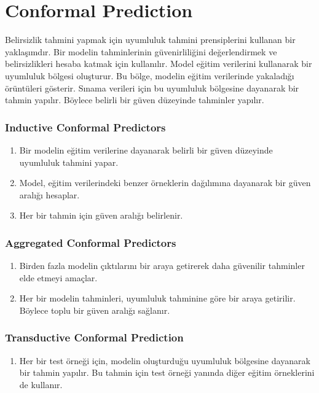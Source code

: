 \section{Conformal Prediction}
Belirsizlik tahmini yapmak için uyumluluk tahmini prensiplerini kullanan bir yaklaşımdır. Bir modelin tahminlerinin güvenirliliğini değerlendirmek ve belirsizlikleri hesaba katmak için kullanılır. Model eğitim verilerini kullanarak bir uyumluluk bölgesi oluşturur. Bu bölge, modelin eğitim verilerinde yakaladığı örüntüleri gösterir. Sınama verileri için bu uyumluluk bölgesine dayanarak bir tahmin yapılır. Böylece belirli bir güven düzeyinde tahminler yapılır.

\subsubsection{Inductive Conformal Predictors}
\begin{enumerate}
    \item Bir modelin eğitim verilerine dayanarak belirli bir güven düzeyinde uyumluluk tahmini yapar.
    \item Model, eğitim verilerindeki benzer örneklerin dağılımına dayanarak bir güven aralığı hesaplar.
    \item Her bir tahmin için güven aralığı belirlenir.
\end{enumerate}

\subsubsection{Aggregated Conformal Predictors}
\begin{enumerate}
    \item Birden fazla modelin çıktılarını bir araya getirerek daha güvenilir tahminler elde etmeyi amaçlar.
    \item Her bir modelin tahminleri, uyumluluk tahminine göre bir araya getirilir. Böylece toplu bir güven aralığı sağlanır.
\end{enumerate}

\subsubsection{Transductive Conformal Prediction}
\begin{enumerate}
    \item Her bir test örneği için, modelin oluşturduğu uyumluluk bölgesine dayanarak bir tahmin yapılır. Bu tahmin için test örneği yanında diğer eğitim örneklerini de kullanır.
\end{enumerate}

\newpage
